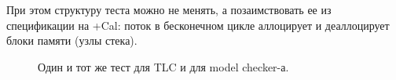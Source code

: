 \begin{comment}

\begin{figure}
	\centerfloat{
		\begin{tabular}{p{0.5\textwidth} p{0.5\textwidth}}
			\centering
			
			\vspace{0pt}
			
			\fbox{\parbox[t][.28\textheight]{0.48\textwidth}{\texttt{[image: specalloc]}}}
			&
			\vspace{0pt} 
			
			\begin{verbatim}
 bool Alloc(Node*& node) {
	Node* pending_head = pending_list_.Top();
	if (allocation_count_.fetch_add(1) == 0) {
		if (pending_head != nullptr
		&& pending_list_.TryClear(pending_head)) {
			node = pending_head;
			pending_head = pending_head->next_.load();
			item_list_.Append(pending_head);
			allocation_count_.fetch_sub(1);
			return true;
		}
	}
	node = item_list_.Pop();
	allocation_count_.fetch_sub(1);
	return node != nullptr;
}
			\end{verbatim}
			
			
			\\
			\hfil +Cal & \hfil \CC
		\end{tabular}
	}
	\bigskip
	\caption{Сравнение спецификации и кода на примере lock-free стека.}
\end{figure}

\end{comment}

При этом структуру теста можно не менять, а позаимствовать ее из спецификации на +Cal: поток в бесконечном цикле аллоцирует и деаллоцирует блоки памяти (узлы стека).

\begin{figure}
	\bigskip
	\caption{Один и тот же тест для TLC и для model checker-а.}
\end{figure}

